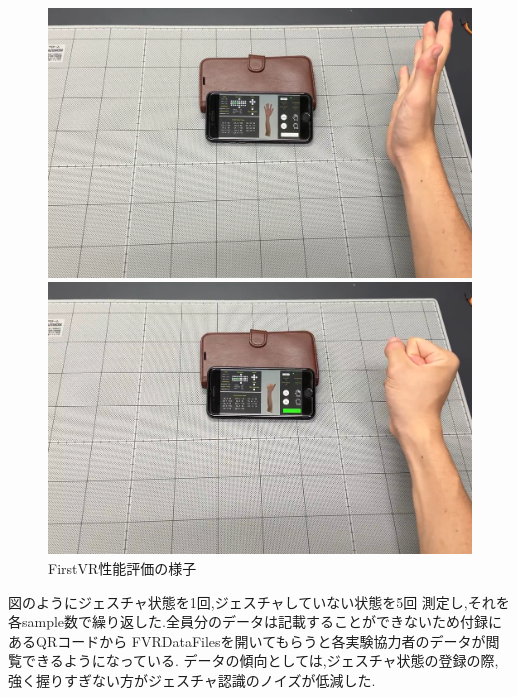 \documentclass{ltjsreport}
\begin{document}
		\begin{figure}[H]
		\centering
		\begin{minipage}{0.45\columnwidth}
		\centering
		\includegraphics[width = \columnwidth]{../figs/IMG_5200.PNG}
		\end{minipage}
		\hspace{0.04\columnwidth}
		\begin{minipage}{0.45\columnwidth}
		\centering
		\includegraphics[width = \columnwidth]{../figs/IMG_5201.PNG}
		\end{minipage}
		\caption{FirstVR性能評価の様子}
		\label{fig:FirstVRevaluation}
		\end{figure}
		
		図のようにジェスチャ状態を1回,ジェスチャしていない状態を5回
		測定し,それを各sample数で繰り返した.全員分のデータは記載することができないため付録にあるQRコードから
		FVRDataFilesを開いてもらうと各実験協力者のデータが閲覧できるようになっている.
		データの傾向としては,ジェスチャ状態の登録の際,強く握りすぎない方がジェスチャ認識のノイズが低減した.
\end{document}
